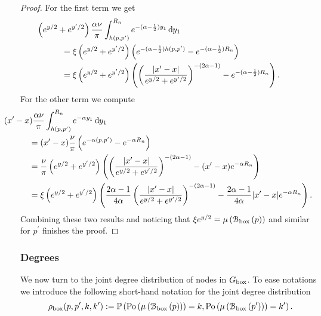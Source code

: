 \begin{proof}
For the first term we get
\begin{align*}
	&\hspace{-30pt}\left(e^{y/2} + e^{y^\prime/2}\right)\frac{\alpha \nu}{\pi}\int_{h(p,p^\prime)}^{R_n} 
		e^{-(\alpha - \frac{1}{2})y_1} \dd y_1\\
	&= \xi\left(e^{y/2} + e^{y^\prime/2}\right)\left(
		e^{-(\alpha - \frac{1}{2})h(p,p^\prime)} - e^{-(\alpha - \frac{1}{2})R_n}\right)\\
	&= \xi\left(e^{y/2} + e^{y^\prime/2}\right)\left(\left(\frac{|x^\prime - x|}{e^{y/2} + 	
		e^{y^\prime/2}}\right)^{-(2\alpha - 1)} - e^{-(\alpha - \frac{1}{2})R_n}\right).
\end{align*}
For the other term we compute
\begin{align*}
	&\hspace{-30pt}(x^\prime - x) \frac{\alpha \nu}{\pi} \int_{h(p,p^\prime)}^{R_n} e^{-\alpha y_1} \dd y_1\\
	&= (x^\prime - x) \frac{\nu}{\pi}\left(e^{-\alpha(p,p^\prime)} - e^{-\alpha R_n}\right)\\
	&= \frac{\nu}{\pi}\left(e^{y/2} + e^{y^\prime/2}\right) \left(
		\left(\frac{|x^\prime - x|}{e^{y/2} + e^{y^\prime/2}}\right)^{-(2\alpha - 1)}
		- (x^\prime - x)e^{-\alpha R_n}\right)\\
	&= \xi\left(e^{y/2} + e^{y^\prime/2}\right)\left(
		\frac{2\alpha - 1}{4\alpha}\left(\frac{|x^\prime - x|}{e^{y/2} + e^{y^\prime/2}}\right)^{-(2\alpha - 1)}
		- \frac{2\alpha - 1}{4\alpha}|x^\prime - x|e^{-\alpha R_n}\right).
\end{align*}
Combining these two results and noticing that $\xi e^{y/2} = \mu\left({\mathcal B}_{\text{box}}\left(p\right)\right)$ and similar for $p^\prime$ finishes the proof.
\end{proof} 

\subsubsection*{Degrees}

We now turn to the joint degree distribution of nodes in $G_{\text{box}}$. To ease notations we introduce the following short-hand notation for the joint degree distribution
\[
	\rho_{\text{box}}(p,p^\prime,k,k^\prime) 
	:= \mathbb{P}\left({\mathrm{Po}}\left(\mu\left({\mathcal B}_{\text{box}}\left(p\right)\right)\right) = k, {\mathrm{Po}}\left(\mu\left({\mathcal B}_{\text{box}}\left(p^\prime\right)\right)\right) = k^\prime\right).
\]

